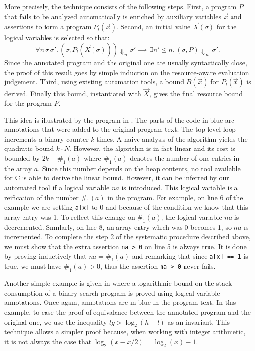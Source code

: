 \documentclass{sigplanconf}
\newcommand{\pref}[1]{\prettyref{#1}}
\begin{document}
More precisely, the technique consists of the following steps. First,
a program $P$ that fails to be analyzed automatically is enriched by
auxiliary variables $\vec x$ and assertions to form a program
$P_l(\vec x)$.  Second, an initial value $\vec X(\sigma)$ for the
logical variables is selected so that:
$$
\forall n\, \sigma\, \sigma'.\,
  (\sigma, P_l(\vec X(\sigma))) \Downarrow_n \sigma'
    {\implies}
  \exists n' {\le} n.\,
    (\sigma, P) \Downarrow_{n'} \sigma'.
$$
Since the annotated program and the original one are usually
syntactically close, the proof of this result goes
by simple induction on the resource-aware evaluation judgement.
Third, using existing automation tools, a bound $B(\vec x)$ for
$P_l(\vec x)$ is derived.  Finally this bound, instantiated with
$\vec X$, gives the final resource bound for the program $P$.

This idea is illustrated by the program in \pref{fig:xmplincaux}.
The parts of the code in blue are annotations that were added
to the original program text.  The top-level loop increments
a binary counter $k$ times.  A naive analysis of
the algorithm yields the quadratic bound $k \cdot N$.
However, the algorithm is in fact linear and its cost is bounded
by $2k + \#_1(a)$ where $\#_1(a)$ denotes
the number of one entries in the array $a$.  Since this
number depends on the heap contents, no tool available
for C is able to derive the linear bound.  However, it can be inferred
by our automated tool if a logical variable $na$ is introduced.
This logical variable is a reification of the
number $\#_1(a)$ in the program.  For example, on line 6 of the example
we are setting \lstinline{a[x]} to 0 and because of the condition we
know that this array entry was 1.  To reflect this change on
$\#_1(a)$, the logical variable $na$ is decremented.
Similarly, on line 8, an array entry which was 0 becomes 1, so
$na$ is incremented.  To complete the step 2 of the systematic
procedure described above, we must show that the extra assertion
\lstinline{na > 0} on line 5 is always true.  It
is done by proving inductively that $na = \#_1(a)$
and remarking that since \lstinline{a[x] == 1} is true, we must have
$\#_1(a) > 0$, thus the assertion \lstinline{na > 0} never fails.

Another simple example is given in \pref{fig:xmplbsaux} where
a logarithmic bound on the stack consumption of a binary search
program is proved using logical variable annotations.  Once again,
annotations are in blue in the program text.  In this example,
to ease the proof of equivalence between the annotated program
and the original one, we use the inequality $lg >
\log_2(h-l)$ as an invariant.  This technique allows a simpler
proof because, when working with integer arithmetic, it is not always
the case that $\log_2(x-x/2) = \log_2(x)-1$.
\end{document}
